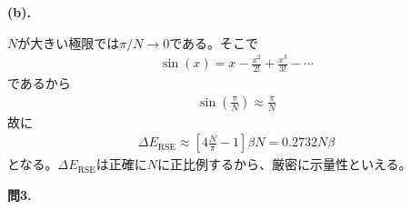 \documentclass{jlreq}
\begin{document}
\noindent
\textbf{(b).}

$N$が大きい極限では$\pi/N\rightarrow 0$である。そこで
\begin{eqnarray}
    \sin(x)=x-\frac{x^2}{2!}+\frac{x^3}{3!}-\cdots
\end{eqnarray}
であるから
\begin{eqnarray}
    \sin\left(\frac{\pi}{N}\right)\approx\frac{\pi}{N}
\end{eqnarray}
故に
\begin{eqnarray}
    \Delta E_\text{RSE}\approx\left[4\frac{N}{\pi}-1\right]\beta N=0.2732N\beta
\end{eqnarray}
となる。$\Delta E_\text{RSE}$は正確に$N$に正比例するから、厳密に示量性といえる。

\clearpage

\noindent
\textbf{問3.}\\
\end{document}
